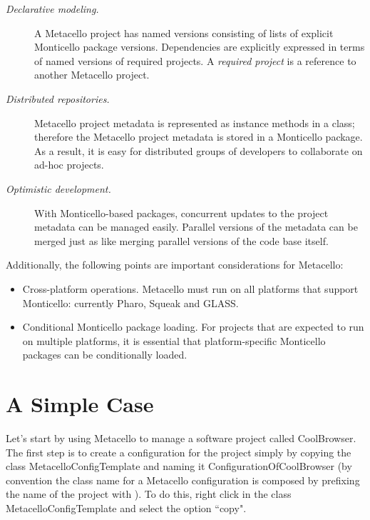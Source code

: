 \documentclass[a4paper,10pt,twoside]{book}
\begin{document}
\begin{description}
\item[\textit{Declarative modeling.}] A Metacello project has named versions consisting of lists of explicit Monticello package versions. Dependencies are explicitly expressed in terms of named versions of required projects. A \emph{required project} is a reference to another Metacello project.

\item[\textit{ Distributed repositories.}] Metacello project metadata is represented as instance methods in a class; therefore the Metacello project metadata is stored in a Monticello package. As a result, it is easy for distributed groups of developers to collaborate on ad-hoc projects.

\item[\textit{ Optimistic development.}] With Monticello-based packages, concurrent updates to the project metadata can be managed easily. Parallel versions of the metadata can be merged just as like merging parallel versions of the code base itself. 

\end{description}

Additionally, the following points are important considerations for Metacello:

\begin{itemize}
\item Cross-platform operations. Metacello must run on all platforms that support Monticello: currently Pharo, Squeak and GLASS.
\item Conditional Monticello package loading. For projects that are expected to run on multiple platforms, it is essential that platform-specific Monticello packages can be conditionally loaded. 
\end{itemize}

\section{A Simple Case}

Let's start by using Metacello to manage a software project called CoolBrowser. The first step is to create a configuration for the project simply by copying the class MetacelloConfigTemplate and naming it ConfigurationOfCoolBrowser (by convention the class name for a Metacello configuration is composed by prefixing the name of the project with ). To do this, right click in the class MetacelloConfigTemplate and select the option ``copy". 
\end{document}
